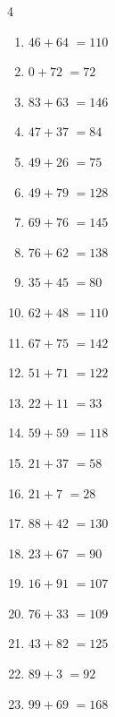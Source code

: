 \begin{multicols}{4}
\begin{enumerate}
  \item $46+64$
        $=110$

  \item $0+72$
        $=72$

  \item $83+63$
        $=146$

  \item $47+37$
        $=84$

  \item $49+26$
        $=75$

  \item $49+79$
        $=128$

  \item $69+76$
        $=145$

  \item $76+62$
        $=138$

  \item $35+45$
        $=80$

  \item $62+48$
        $=110$

  \item $67+75$
        $=142$

\columnbreak %

  \item $51+71$
        $=122$

  \item $22+11$
        $=33$

  \item $59+59$
        $=118$

  \item $21+37$
        $=58$

  \item $21+7$
        $=28$

  \item $88+42$
        $=130$

  \item $23+67$
        $=90$

  \item $16+91$
        $=107$

  \item $76+33$
        $=109$

  \item $43+82$
        $=125$

  \item $89+3$
        $=92$

  \item $99+69$
        $=168$


\end{enumerate}
\end{multicols}
